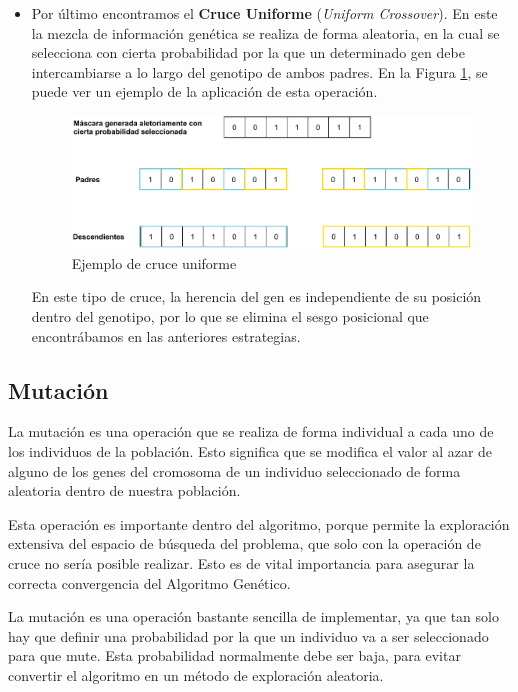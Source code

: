 \begin{itemize}
    \item Por último encontramos el \textbf{Cruce Uniforme} (\textit{Uniform Crossover}). En este la mezcla de información genética se realiza de forma aleatoria, en la cual se selecciona con cierta probabilidad por la que un determinado gen debe intercambiarse a lo largo del genotipo de ambos padres. En la Figura \ref{fig:cruce_uniforme}, se puede ver un ejemplo de la aplicación de esta operación.\\
    
    \begin{figure}[h]
         \centering
         \includegraphics[width=1.1\textwidth]{figuras/desarrollo teorico/cruce_uniforme.pdf}
         \caption{Ejemplo de cruce uniforme}
         \label{fig:cruce_uniforme}
    \end{figure}

    En este tipo de cruce, la herencia del gen es independiente de su posición dentro del genotipo, por lo que se elimina el sesgo posicional que encontrábamos en las anteriores estrategias.

\end{itemize}


\subsection{Mutación}

La mutación es una operación que se realiza de forma individual a cada uno de los individuos de la población. Esto significa que se modifica el valor al azar de alguno de los genes del cromosoma de un individuo seleccionado de forma aleatoria dentro de nuestra población.

Esta operación es importante dentro del algoritmo, porque permite la exploración extensiva del espacio de búsqueda del problema, que solo con la operación de cruce no sería posible realizar. Esto es de vital importancia para asegurar la correcta convergencia del Algoritmo Genético.

La mutación es una operación bastante sencilla de implementar, ya que tan solo hay que definir una probabilidad por la que un individuo va a ser seleccionado para que mute. Esta probabilidad normalmente debe ser baja, para evitar convertir el algoritmo en un método de exploración aleatoria.

